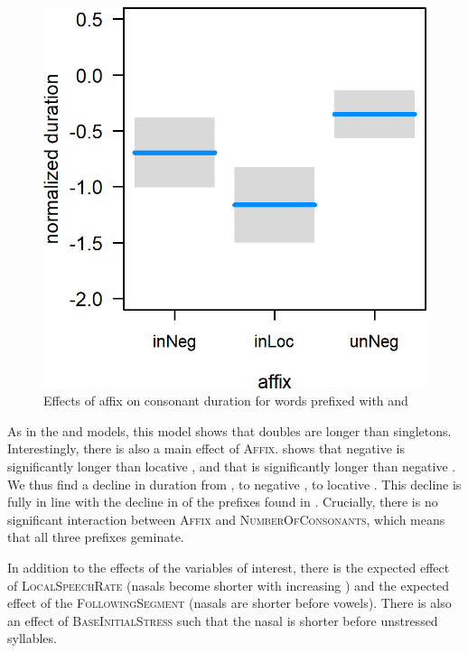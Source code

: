 \begin{figure}
	\includegraphics[scale=0.8] {images/Corpus/unInModel.png}
	\caption{Effects of  affix on consonant duration for words prefixed with  and }
	\label{fig:inUnModel}
\end{figure}



As in the  and models, this model shows that doubles are longer than singletons. Interestingly, there is also  a  main effect of \textsc{Affix}.  shows that negative  is significantly longer than locative , and that  is significantly longer than negative .  We thus find a decline in duration from , to negative , to locative . This decline is fully in line with the decline in  of the prefixes found in . Crucially, there is no significant interaction between \textsc{Affix} and \textsc{NumberOfConsonants}, which means that all three prefixes geminate.

In addition to the effects of the variables of interest, there is the expected effect of \textsc{LocalSpeechRate} (nasals become shorter with increasing ) and the expected effect of the \textsc{FollowingSegment} (nasals are shorter before vowels). There is also an effect of \textsc{BaseInitialStress} such that the nasal is shorter before unstressed syllables.

